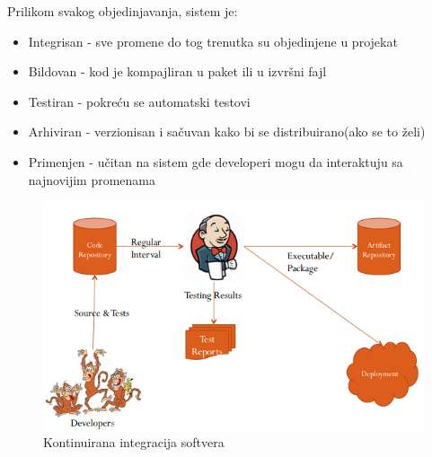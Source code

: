 \documentclass[a4paper]{article}
\begin{document}
{Prilikom svakog objedinjavanja, sistem je:
\begin{itemize}
\item Integrisan - sve promene do tog trenutka su objedinjene u projekat
\item Bildovan - kod je kompajliran u paket ili u izvršni fajl
\item Testiran - pokreću se automatski testovi
\item Arhiviran - verzionisan i sačuvan kako bi se distribuirano(ako se to želi)
\item Primenjen - učitan na sistem gde developeri mogu da interaktuju sa najnovijim promenama
\end{itemize} 

\begin{figure}[ht]
\begin{center}
\includegraphics[scale=0.75, totalheight=0.35\textheight]{slike/workflow.png}
\end{center}
\caption{Kontinuirana integracija softvera}
\label{fig:kontinuirana_integracija_softvera}
\end{figure}







}
\end{document}
